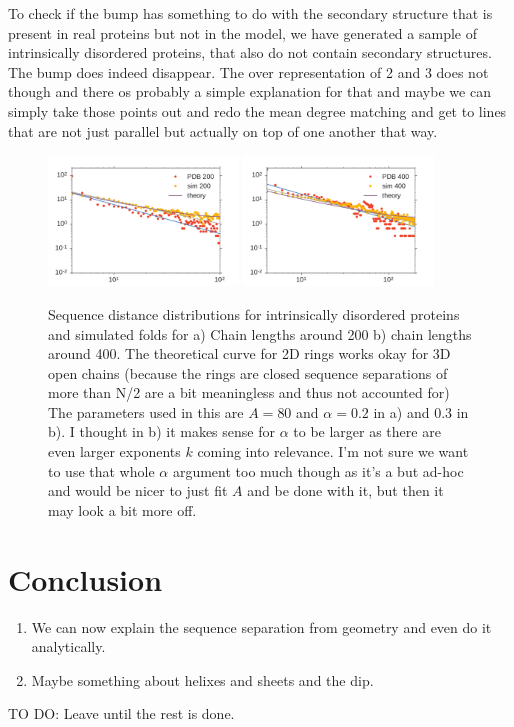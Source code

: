 \documentclass[reprint,amsmath,amssymb,rmp,onecolumn,notitlepage,11pt]{revtex4-1}
\newcommand{\red}[1]{\textcolor{red!80!black}{#1}}
\begin{document}
\red{To check if the bump has something to do with the secondary structure that is present in real proteins but not in the model, we have generated a sample of intrinsically disordered proteins, that also do not contain secondary structures. The bump does indeed disappear. The over representation of 2 and 3 does not though and there os probably a simple explanation for that and maybe we can simply take those points out and redo the mean degree matching and get to lines that are not just parallel but actually on top of one another that way.}
\begin{figure}[h]
        \centering
	\includegraphics[width=0.45\textwidth]{figures/idp_200.pdf}
	\includegraphics[width=0.45\textwidth]{figures/idp_400.pdf}
        \caption{Sequence distance distributions for intrinsically disordered proteins and simulated folds for a) Chain lengths around 200 b) chain lengths around 400. The theoretical curve for 2D rings works okay for 3D open chains (because the rings are closed sequence separations of more than N/2 are a bit meaningless and thus not accounted for) The parameters used in this are $A=80$ and $\alpha=0.2$ in a) and $0.3$ in b). I thought in b) it makes sense for $\alpha$ to be larger as there are even larger exponents $k$ coming into relevance. I'm not sure we want to use that whole $\alpha$ argument too much though as it's a but ad-hoc and would be nicer to just fit $A$ and be done with it, but then it may look a bit more off.
        }
        \label{fig:time_scaling}
\end{figure}
\section*{Conclusion}
\begin{enumerate}
    \item We can now explain the sequence separation from geometry and even do it analytically.
    \item Maybe something about helixes and sheets and the dip.
\end{enumerate}
TO DO: Leave until the rest is done.
\end{document}
